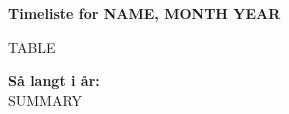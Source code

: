 \documentclass[a4paper,11pt]{letter}
\newcommand*{\SignatureAndDate}[1]{%
    \par\noindent\makebox[2.5in]{\hrulefill} \hfill \hfill \makebox[2.5in]{\hrulefill}%
}%
\begin{document}
  \thispagestyle{empty}
  {\Large \bf Timeliste for NAME, MONTH YEAR}
  
  \vspace{1cm}
  
  \begin{center}
    TABLE
  \end{center}
  \vspace{1cm}
{\bf Så langt i år:}\\
  SUMMARY

\vspace{3cm}
\SignatureAndDate{}
\end{document}
